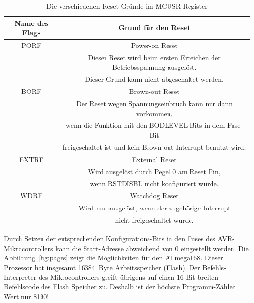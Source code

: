 \begin{table}[H]
  \begin{center}
    \begin{tabular}{| c | c |}
    \hline
              Name des Flags & Grund für den Reset \\
    \hline
    \hline
              PORF & Power-on Reset \\
                   & Dieser Reset wird beim ersten Erreichen der Betriebsspannung ausgelöst.\\
                   & Dieser Grund kann nicht abgeschaltet werden.\\
    \hline
              BORF & Brown-out Reset \\
                   & Der Reset wegen Spannungseinbruch kann nur dann vorkommen, \\
                   & wenn die Funktion mit den BODLEVEL Bits in dem Fuse-Bit \\
                   & freigeschaltet ist und kein Brown-out Interrupt benutzt wird.\\
    \hline
              EXTRF & External Reset \\
                    & Wird ausgelöst durch Pegel 0 am Reset Pin, \\
                    & wenn RSTDISBL nicht konfiguriert wurde. \\
    \hline
              WDRF & Watchdog Reset \\
		   & Wird nur ausgelöst, wenn der zugehörige Interrupt \\
		   & nicht freigeschaltet wurde. \\
    \hline
    \end{tabular}
  \end{center}
  \caption{Die verschiedenen Reset Gründe im MCUSR Register}
  \label{tab:resets}
\end{table}

Durch Setzen der entsprechenden Konfigurations-Bits in den Fuses des AVR-Mikrocontrollers
kann die Start-Adresse abweichend von 0 eingestellt werden.
Die Abbildung~\ref{fig:pages} zeigt die Möglichkeiten für den ATmega168.
Dieser Prozessor hat insgesamt 16384~Byte Arbeitsspeicher (Flash).
Der Befehls-Interpreter des Mikrocontrollers greift übrigens auf
einen 16-Bit breiten Befehlscode des Flash Speicher zu.
Deshalb ist der höchste Programm-Zähler Wert nur 8190!

